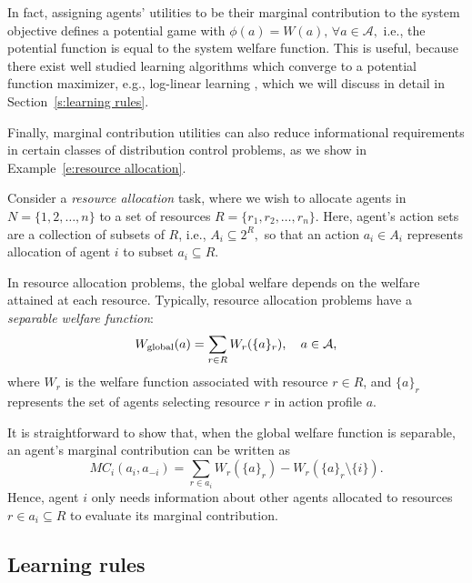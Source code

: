 In fact, assigning agents' utilities to be their marginal contribution to the system objective defines a potential game with $\phi(a) = W(a),\,\forall a\in \mathcal{A},$ i.e., the potential function is equal to the system welfare function. This is useful, because there exist well studied learning algorithms which converge to a potential function maximizer, e.g., log-linear learning \cite{Blume1993}, which we will discuss in detail in Section~\ref{s:learning rules}. 


Finally, marginal contribution utilities can also reduce informational requirements in certain classes of distribution control problems, as we show in  Example~\ref{e:resource allocation}.

\begin{example}
Consider a {\it resource allocation} task, where we wish to allocate agents in $N = \{1,2,\ldots, n\}$ to a set of resources $R = \{r_1,r_2,\ldots,r_n\}$. Here, agent's action sets are a collection of subsets of $R$, i.e., $A_i\subseteq 2^R,$ so that an action $a_i\in A_i$ represents allocation of agent $i$ to subset $a_i\subseteq R.$

In resource allocation problems, the global welfare depends on the welfare attained at each resource. Typically, resource allocation problems have a {\it separable welfare function}:
$$W_{\rm global}(a) = \sum_{r\in R} W_r(\{a\}_r),\quad a\in\mathcal{A},$$
where $W_r$ is the welfare function associated with resource $r\in R$, and $\{a\}_r$ represents the set of agents selecting resource $r$ in action profile $a$. 

It is straightforward to show that, when the global welfare function is separable, an agent's marginal contribution can be written as
$$MC_i(a_i,a_{-i}) = \sum_{r\in a_i}W_r\left(\{a\}_r\right) - W_r\left(\{a\}_r\setminus\{i\}\right).$$
Hence, agent $i$ only needs information about other agents allocated to resources $r\in a_i\subseteq R$ to evaluate its marginal contribution.
\end{example}


\subsection{Learning rules}











